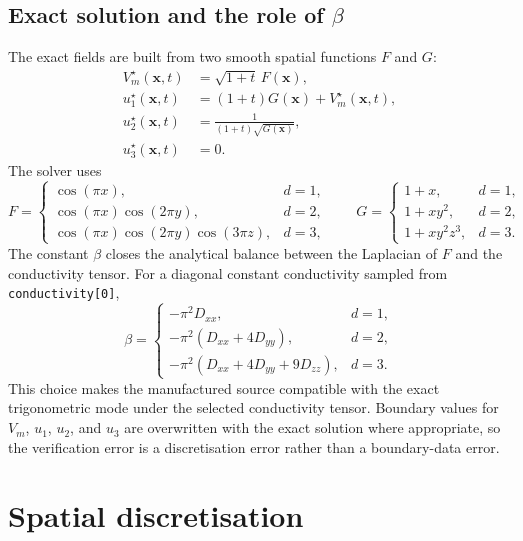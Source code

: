 \documentclass[11pt,a4paper]{article}
\newcommand{\code}[1]{\texttt{\small #1}}
\newcommand{\Vm}{V_m}
\begin{document}
\subsection{Exact solution and the role of \texorpdfstring{$\beta$}{beta}}

The exact fields are built from two smooth spatial functions $F$ and $G$:
\begin{align}
  \Vm^\star(\mathbf{x},t) &= \sqrt{1+t}\,F(\mathbf{x}),\\
  u_1^\star(\mathbf{x},t) &= (1+t)G(\mathbf{x})+\Vm^\star(\mathbf{x},t),\\
  u_2^\star(\mathbf{x},t) &= \frac{1}{(1+t)\sqrt{G(\mathbf{x})}},\\
  u_3^\star(\mathbf{x},t) &= 0.
\end{align}
The solver uses
\begin{equation}
F =
\begin{cases}
\cos(\pi x), & d=1,\\
\cos(\pi x)\cos(2\pi y), & d=2,\\
\cos(\pi x)\cos(2\pi y)\cos(3\pi z), & d=3,
\end{cases}
\qquad
G =
\begin{cases}
1+x, & d=1,\\
1+x y^2, & d=2,\\
1+x y^2 z^3, & d=3.
\end{cases}
\end{equation}
The constant $\beta$ closes the analytical balance between the Laplacian of
$F$ and the conductivity tensor. For a diagonal constant conductivity sampled
from \code{conductivity[0]},
\begin{equation}
  \beta =
  \begin{cases}
    -\pi^2 D_{xx}, & d=1,\\
    -\pi^2(D_{xx}+4D_{yy}), & d=2,\\
    -\pi^2(D_{xx}+4D_{yy}+9D_{zz}), & d=3.
  \end{cases}
\end{equation}
This choice makes the manufactured source compatible with the exact
trigonometric mode under the selected conductivity tensor. Boundary values for
$\Vm$, $u_1$, $u_2$, and $u_3$ are overwritten with the exact solution where
appropriate, so the verification error is a discretisation error rather than a
boundary-data error.

\section{Spatial discretisation}
\end{document}
